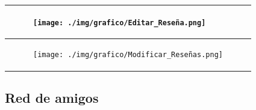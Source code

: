 \documentclass{report}
\begin{document}
\begin{center}
\begin{longtable}{|p{\linewidth}|}
                \begin{figure}[H]
                    \centering
                    \texttt{[image: ./img/grafico/Editar\_Reseña.png]}
                \end{figure}\\
                \hline
                \begin{figure}[H]
                    \centering
                    \texttt{[image: ./img/grafico/Modificar\_Reseñas.png]}
                \end{figure}\\
                \hline
            \end{longtable}
        \end{center}
        \clearpage
        \subsection{Red de amigos}
        \clearpage
\end{document}
